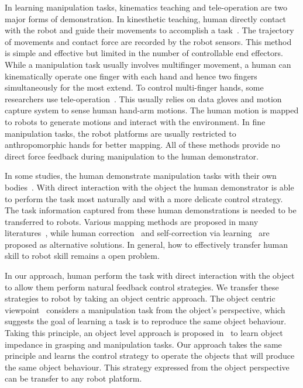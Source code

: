 In learning manipulation tasks, kinematics teaching and tele-operation are two major forms of demonstration. In kinesthetic teaching, human directly contact with the robot and guide their movements to accomplish a task~\cite{korkinof2013online,pais2014encoding,pastor2011skill,Miao2014}. The trajectory of movements and contact force are recorded by the robot sensors.
This method is simple and effective but limited in the number of controllable end effectors. While a manipulation task usually involves multifinger movement, a human can kinematically operate one finger with each hand and hence two fingers simultaneously for the most extend. To control multi-finger hands, some researchers use tele-operation~\cite{bernardino2013precision,kondo2008recognition,Fischer98}. This usually relies on data gloves and motion capture system to sense human hand-arm motions. The human motion is mapped to robots to generate motions and interact with the environment. In fine manipulation tasks, the robot platforms are usually restricted to anthropomorphic hands for better mapping. All of these methods provide no direct force feedback during manipulation to the human demonstrator.

In some studies, the human demonstrate manipulation tasks with their own bodies~\cite{asfour2008imitation}. With direct interaction with the object the human demonstrator is able to perform the task most naturally and with a more delicate control strategy. The task information captured from these human demonstrations is needed to be transferred to robots. Various mapping methods are proposed in many literatures~\cite{do2011towards,asfour2008imitation,hueser2006learning}, while human correction~\cite{calinon2007incremental,sauser2011iterative,romano2011human} and self-correction via learning~\cite{bidan2013robio} are proposed as alternative solutions. In general, how to effectively transfer human skill to robot skill remains a open problem.

In our approach, human perform the task with direct interaction with the object to allow them perform natural feedback control strategies. We transfer these strategies to robot by taking an object centric approach. The object centric viewpoint~\cite{okamura2000overview} considers a manipulation task from the object's perspective, which suggests the goal of learning a task is to reproduce the same object behaviour. Taking this principle, an object level approach is proposed in~\cite{Miao2014} to learn object impedance in grasping and manipulation tasks. Our approach takes the same principle and learns the control strategy to operate the objects that will produce the same object behaviour. This strategy expressed from the object perspective can be transfer to any robot platform.

